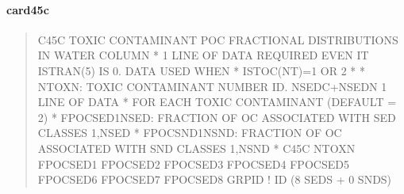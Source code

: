 \documentclass[letterpaper,10pt,english]{sphinxmanual}
\begin{document}
\paragraph{card45c}
\label{\detokenize{inputfiles/runcontrol/card45c:card45c}}\label{\detokenize{inputfiles/runcontrol/card45c::doc}}\begin{quote}

\begin{sphinxVerbatim}[commandchars=\\\{\}]
\PYGZhy{}\PYGZhy{}\PYGZhy{}\PYGZhy{}\PYGZhy{}\PYGZhy{}\PYGZhy{}\PYGZhy{}\PYGZhy{}\PYGZhy{}\PYGZhy{}\PYGZhy{}\PYGZhy{}\PYGZhy{}\PYGZhy{}\PYGZhy{}\PYGZhy{}\PYGZhy{}\PYGZhy{}\PYGZhy{}\PYGZhy{}\PYGZhy{}\PYGZhy{}\PYGZhy{}\PYGZhy{}\PYGZhy{}\PYGZhy{}\PYGZhy{}\PYGZhy{}\PYGZhy{}\PYGZhy{}\PYGZhy{}\PYGZhy{}\PYGZhy{}\PYGZhy{}\PYGZhy{}\PYGZhy{}\PYGZhy{}\PYGZhy{}\PYGZhy{}\PYGZhy{}\PYGZhy{}\PYGZhy{}\PYGZhy{}\PYGZhy{}\PYGZhy{}\PYGZhy{}\PYGZhy{}\PYGZhy{}\PYGZhy{}\PYGZhy{}\PYGZhy{}\PYGZhy{}\PYGZhy{}\PYGZhy{}\PYGZhy{}\PYGZhy{}\PYGZhy{}\PYGZhy{}\PYGZhy{}\PYGZhy{}\PYGZhy{}\PYGZhy{}\PYGZhy{}\PYGZhy{}\PYGZhy{}\PYGZhy{}\PYGZhy{}\PYGZhy{}\PYGZhy{}\PYGZhy{}\PYGZhy{}\PYGZhy{}\PYGZhy{}\PYGZhy{}\PYGZhy{}\PYGZhy{}\PYGZhy{}
C45C TOXIC CONTAMINANT POC FRACTIONAL DISTRIBUTIONS IN WATER COLUMN
*    1 LINE  OF DATA REQUIRED EVEN IT ISTRAN(5) IS 0. DATA USED WHEN
*      ISTOC(NT)=1 OR 2
*
*     NTOXN:      TOXIC CONTAMINANT NUMBER ID.  NSEDC+NSEDN 1 LINE OF DATA
*                 FOR EACH TOXIC CONTAMINANT (DEFAULT = 2)
*  FPOCSED1\PYGZhy{}NSED: FRACTION OF OC ASSOCIATED WITH SED CLASSES 1,NSED
*  FPOCSND1\PYGZhy{}NSND: FRACTION OF OC ASSOCIATED WITH SND CLASSES 1,NSND
*
C45C     NTOXN  FPOCSED1  FPOCSED2  FPOCSED3  FPOCSED4  FPOCSED5  FPOCSED6  FPOCSED7  FPOCSED8      GRPID ! ID (8 SEDS + 0 SNDS)
\end{sphinxVerbatim}
\end{quote}
\end{document}
